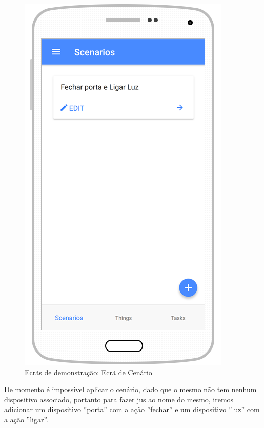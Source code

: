 \begin{figure}[H]
  \centering
        \includegraphics[scale=0.6]{img/demo/list_scenario.png}
  \caption{Ecrãs de demonstração: Ecrã de Cenário}
\end{figure}

De momento é impossível aplicar o cenário, dado que o mesmo não tem nenhum dispositivo associado, portanto para fazer jus ao nome do mesmo, iremos adicionar um dispositivo ''porta'' com a ação ''fechar'' e um dispositivo ''luz'' com a ação ''ligar''.

